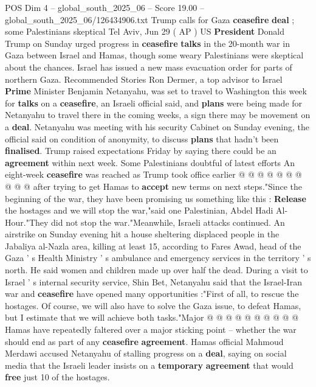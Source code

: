 \begin{textsample}{POS Dim 4 – global\_south\_2025\_06 – Score 19.00 – global\_south\_2025\_06/126434906.txt}  \label{ex:f4_pos_358}
Trump calls for Gaza \textbf{ceasefire} \textbf{deal} ; some Palestinians skeptical Tel Aviv, Jun 29 ( AP ) US \textbf{President} Donald Trump on Sunday urged progress in \textbf{ceasefire} \textbf{talks} in the 20-month war in Gaza between Israel and Hamas, though some weary Palestinians were skeptical about the chances.
Israel has issued a new mass evacuation order for parts of northern Gaza.
Recommended Stories Ron Dermer, a top advisor to Israel \textbf{Prime} Minister Benjamin Netanyahu, was set to travel to Washington this week for \textbf{talks} on a \textbf{ceasefire}, an Israeli official said, and \textbf{plans} were being made for Netanyahu to travel there in the coming weeks, a sign there may be movement on a \textbf{deal}.
Netanyahu was meeting with his security Cabinet on Sunday evening, the official said on condition of anonymity, to discuss \textbf{plans} that hadn't been \textbf{finalised}.
Trump raised expectations Friday by saying there could be an \textbf{agreement} within next week.
Some Palestinians doubtful of latest efforts An eight-week \textbf{ceasefire} was reached as Trump took office earlier @ @ @ @ @ @ @ @ @ @ after trying to get Hamas to \textbf{accept} new terms on next steps."Since the beginning of the war, they have been promising us something like this : \textbf{Release} the hostages and we will stop the war,"said one Palestinian, Abdel Hadi Al-Hour."They did not stop the war."Meanwhile, Israeli attacks continued.
An airstrike on Sunday evening hit a house sheltering displaced people in the Jabaliya al-Nazla area, killing at least 15, according to Fares Awad, head of the Gaza ' s Health Ministry ' s ambulance and emergency services in the territory ' s north.
He said women and children made up over half the dead.
During a visit to Israel ' s internal security service, Shin Bet, Netanyahu said that the Israel-Iran war and \textbf{ceasefire} have opened many opportunities :"First of all, to rescue the hostages.
Of course, we will also have to solve the Gaza issue, to defeat Hamas, but I estimate that we will achieve both tasks."Major @ @ @ @ @ @ @ @ @ @ Hamas have repeatedly faltered over a major sticking point -- whether the war should end as part of any \textbf{ceasefire} \textbf{agreement}.
Hamas official Mahmoud Merdawi accused Netanyahu of stalling progress on a \textbf{deal}, saying on social media that the Israeli leader insists on a \textbf{temporary} \textbf{agreement} that would \textbf{free} just 10 of the hostages.

\end{textsample}
